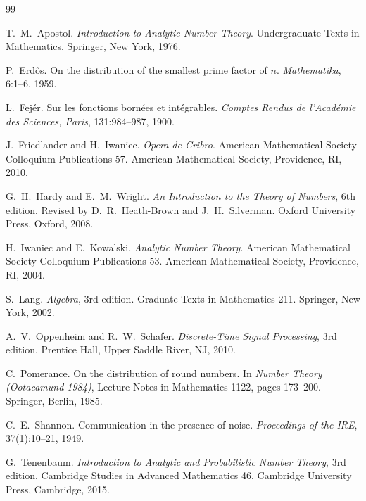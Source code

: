 \documentclass[11pt,reqno]{amsart}
\theoremstyle{plain}
\theoremstyle{definition}
\theoremstyle{remark}
\begin{document}
\begin{thebibliography}{99}

T.~M.~Apostol.
\newblock \emph{Introduction to Analytic Number Theory}.
\newblock Undergraduate Texts in Mathematics. Springer, New York, 1976.

P.~Erd\H{o}s.
\newblock On the distribution of the smallest prime factor of $n$.
\newblock \emph{Mathematika}, 6:1--6, 1959.

L.~Fej\'{e}r.
\newblock Sur les fonctions born\'{e}es et int\'{e}grables.
\newblock \emph{Comptes Rendus de l'Acad\'{e}mie des Sciences, Paris},
131:984--987, 1900.

J.~Friedlander and H.~Iwaniec.
\newblock \emph{Opera de Cribro}.
\newblock American Mathematical Society Colloquium Publications 57.
\newblock American Mathematical Society, Providence, RI, 2010.

G.~H.~Hardy and E.~M.~Wright.
\newblock \emph{An Introduction to the Theory of Numbers}, 6th edition.
\newblock Revised by D.~R.~Heath-Brown and J.~H.~Silverman.
\newblock Oxford University Press, Oxford, 2008.

H.~Iwaniec and E.~Kowalski.
\newblock \emph{Analytic Number Theory}.
\newblock American Mathematical Society Colloquium Publications 53.
\newblock American Mathematical Society, Providence, RI, 2004.

S.~Lang.
\newblock \emph{Algebra}, 3rd edition.
\newblock Graduate Texts in Mathematics 211. Springer, New York, 2002.

A.~V.~Oppenheim and R.~W.~Schafer.
\newblock \emph{Discrete-Time Signal Processing}, 3rd edition.
\newblock Prentice Hall, Upper Saddle River, NJ, 2010.

C.~Pomerance.
\newblock On the distribution of round numbers.
\newblock In \emph{Number Theory (Ootacamund 1984)}, Lecture Notes in
Mathematics 1122, pages 173--200. Springer, Berlin, 1985.

C.~E.~Shannon.
\newblock Communication in the presence of noise.
\newblock \emph{Proceedings of the IRE}, 37(1):10--21, 1949.

G.~Tenenbaum.
\newblock \emph{Introduction to Analytic and Probabilistic Number Theory},
3rd edition.
\newblock Cambridge Studies in Advanced Mathematics 46. Cambridge
University Press, Cambridge, 2015.


\end{thebibliography}
\end{document}

